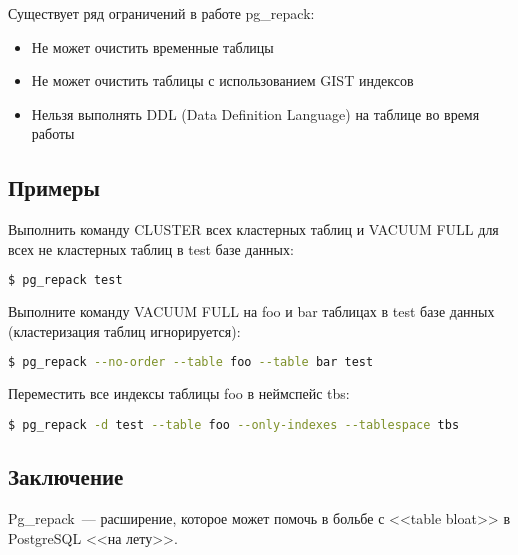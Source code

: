 Существует ряд ограничений в работе pg\_repack:

\begin{itemize}
  \item Не может очистить временные таблицы
  \item Не может очистить таблицы с использованием GIST индексов
  \item Нельзя выполнять DDL (Data Definition Language) на таблице во время работы
\end{itemize}

\subsection{Примеры}

Выполнить команду CLUSTER всех кластерных таблиц и VACUUM FULL для всех не кластерных таблиц в test базе данных:

\begin{lstlisting}[language=Bash,label=lst:pgrepack1]
$ pg_repack test
\end{lstlisting}

Выполните команду VACUUM FULL на foo и bar таблицах в test базе данных (кластеризация таблиц игнорируется):

\begin{lstlisting}[language=Bash,label=lst:pgrepack2]
$ pg_repack --no-order --table foo --table bar test
\end{lstlisting}

Переместить все индексы таблицы foo в неймспейс tbs:

\begin{lstlisting}[language=Bash,label=lst:pgrepack3]
$ pg_repack -d test --table foo --only-indexes --tablespace tbs
\end{lstlisting}

\subsection{Заключение}

Pg\_repack~--- расширение, которое может помочь в больбе с <<table bloat>> в PostgreSQL <<на лету>>.